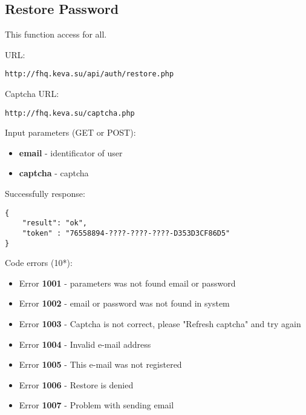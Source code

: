 \subsection{Restore Password}
\par

This function access for all.

URL:
\begin{Verbatim}[frame=single]
http://fhq.keva.su/api/auth/restore.php
\end{Verbatim}

Captcha URL:
\begin{Verbatim}[frame=single]
http://fhq.keva.su/captcha.php
\end{Verbatim}

Input parameters (GET or POST):
\begin{itemize}
  \item \textbf{email} - identificator of user
  \item \textbf{captcha} - captcha
\end{itemize}

Successfully response:  \\
\begin{Verbatim}[frame=single]
{
    "result": "ok",
    "token" : "76558894-????-????-????-D353D3CF86D5"
}
\end{Verbatim}

Code errors (10*):
\begin{itemize}
	\item {\color{red} Error \textbf{1001} - parameters was not found email or password}
	\item {\color{red} Error \textbf{1002} - email or password was not found in system}
	\item {\color{red} Error \textbf{1003} - Captcha is not correct, please "Refresh captcha" and try again}
	\item {\color{red} Error \textbf{1004} - Invalid e-mail address}
	\item {\color{red} Error \textbf{1005} - This e-mail was not registered}
	\item {\color{red} Error \textbf{1006} - Restore is denied}
	\item {\color{red} Error \textbf{1007} - Problem with sending email}
\end{itemize}
